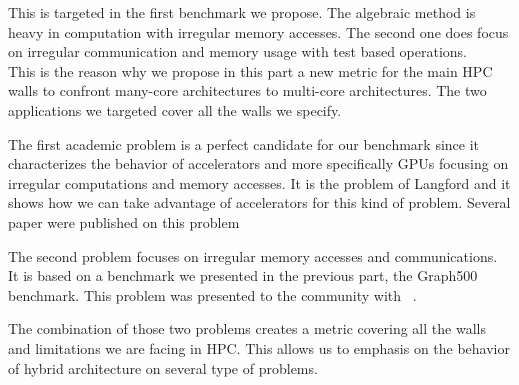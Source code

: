 This is targeted in the first benchmark we propose. 
The algebraic method is heavy in computation with irregular memory accesses. 
The second one does focus on irregular communication and memory usage with test based operations.\\

This is the reason why we propose in this part a new metric for the main HPC walls to confront many-core architectures to multi-core architectures. 
The two applications we targeted cover all the walls we specify. 

The first academic problem is a perfect candidate for our benchmark since it characterizes the behavior of accelerators and more specifically GPUs focusing on irregular computations and memory accesses. 
It is the problem of Langford and it shows how we can take advantage of accelerators for this kind of problem.
Several paper were published on this problem ~\cite{krajecki2016many,deleau2014towards,j2016resolution,jaillet2014Langford} 

The second problem focuses on irregular memory accesses and communications. 
It is based on a benchmark we presented in the previous part, the Graph500 benchmark.
This problem was presented to the community with ~\cite{krajecki2016bfs,loiseau2015parcours,loiseau2015GTC}.

The combination of those two problems creates a metric covering all the walls and limitations we are facing in HPC. 
This allows us to emphasis on the behavior of hybrid architecture on several type of problems.

